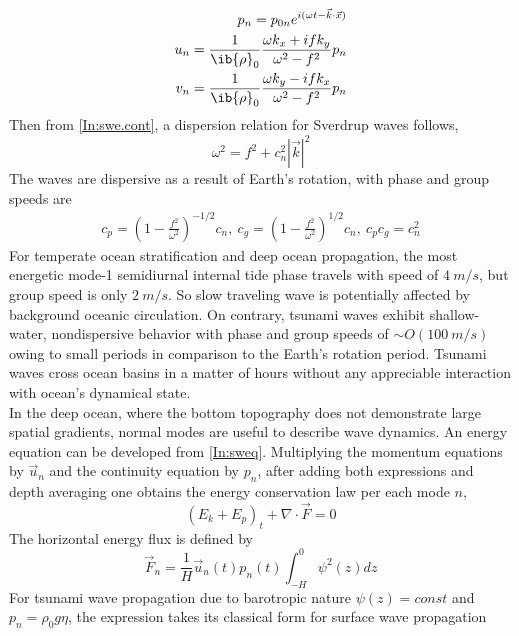 \documentclass[12pt]{article}
\begin{document}
\begin{align}
\begin{split}
p_n = p_{0n} e^{i (\omega t - \vec{k} \cdot \vec{x})}\\
u_n = \frac{1}{\ib{\rho}_0} \frac{\omega k_x + i f k_y}{\omega^2 - f^2} p_n\\
v_n = \frac{1}{\ib{\rho}_0} \frac{\omega k_y - i f k_x}{\omega^2 - f^2} p_n
\end{split}
\end{align}
Then from \eqref{In:swe.cont}, a dispersion relation for Sverdrup waves follows,
\begin{equation}
\omega^2 = f^2 + c^2_n |\vec{k}|^2
\end{equation}
The waves are dispersive as a result of Earth's rotation, with phase and group speeds are
\begin{align}
c_{p} = (1 - \frac{f^2}{\omega^2})^{-1/2} c_n,~c_g = (1 - \frac{f^2}{\omega^2})^{1/2} c_n,~c_p c_g 
= c_n^2
\end{align}
For temperate ocean stratification and deep ocean propagation, the most energetic mode-1 
semidiurnal internal tide phase travels with speed of $4~m/s$, but group speed is only $2~m/s$. So 
slow traveling wave is potentially affected by background oceanic circulation. On contrary, tsunami 
waves exhibit shallow-water, nondispersive behavior with phase and group speeds of $\sim 
O(100~m/s)$ owing to small periods in comparison to the Earth's rotation period. Tsunami waves 
cross ocean basins in a matter of hours without any appreciable interaction with ocean's dynamical 
state.\\
In the deep ocean, where the bottom topography does not demonstrate large spatial gradients, normal 
modes are useful to describe wave dynamics. An energy equation can be developed from 
\eqref{In:sweq}. Multiplying the momentum equations by $\vec{u}_n$ and the continuity equation by 
$p_n$, after adding both expressions and depth averaging one obtains the energy conservation law 
per each mode $n$,
\begin{equation}
(E_k + E_p)_t + \nabla \cdot \vec{F} = 0 \label{In:eneq}
\end{equation}
The horizontal energy flux is defined by
\begin{equation}
\vec{F}_n = \frac{1}{H} \vec{u}_n(t) p_n(t) \int_{-H}^0 \psi^2(z) dz \label{In:fldef}
\end{equation}
For tsunami wave propagation due to barotropic nature $\psi(z) = const$ and $p_n = \rho_0 g 
\eta$, the expression takes its classical form for surface wave propagation 
\end{document}
